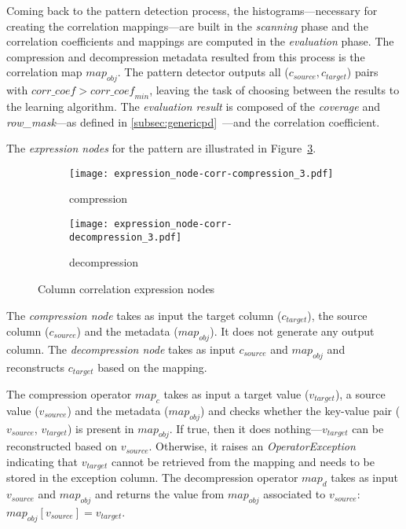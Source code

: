Coming back to the pattern detection process, the histograms---necessary for creating the correlation mappings---are built in the \textit{scanning} phase and the correlation coefficients and mappings are computed in the \textit{evaluation} phase. The compression and decompression metadata resulted from this process is the correlation map \(map_{obj}\). The pattern detector outputs all (\(c_{source}, c_{target}\)) pairs with \(\mathit{corr\_coef} > \mathit{corr\_coef}_{min}\), leaving the task of choosing between the results to the learning algorithm. The \textit{evaluation result} is composed of the \textit{coverage} and \textit{row\_mask}---as defined in \ref{subsec:genericpd}~---and the correlation coefficient.

The \textit{expression nodes} for the  pattern are illustrated in Figure~\ref{fig:pd:columncorrelation:exprnode}.

\begin{figure}[h]
  \centering
  \begin{subfigure}[t]{0.45\linewidth}
    \centering
    \texttt{[image: expression\_node-corr-compression\_3.pdf]}
    \caption[b]{compression}
    \label{fig:pd:columncorrelation:exprnode:compression}
  \end{subfigure}
  \hspace{3em}
  \begin{subfigure}[t]{0.30\linewidth}
    \centering
    \texttt{[image: expression\_node-corr-decompression\_3.pdf]}
    \caption[b]{decompression}
    \label{fig:pd:columncorrelation:exprnode:decompression}
  \end{subfigure}
  \caption{Column correlation expression nodes}
  \label{fig:pd:columncorrelation:exprnode}
\end{figure}

The \textit{compression node} takes as input the target column (\(c_{target}\)), the source column (\(c_{source}\)) and the metadata (\(map_{obj}\)). It does not generate any output column. The \textit{decompression node} takes as input \(c_{source}\) and \(map_{obj}\) and reconstructs \(c_{target}\) based on the mapping.

The compression operator \(map_{c}\) takes as input a target value (\(v_{target}\)), a source value (\(v_{source}\)) and the metadata (\(map_{obj}\)) and checks whether the key-value pair (\(v_{source}\), \(v_{target}\)) is present in \(map_{obj}\). If true, then it does nothing---\(v_{target}\) can be reconstructed based on \(v_{source}\). Otherwise, it raises an \textit{OperatorException} indicating that \(v_{target}\) cannot be retrieved from the mapping and needs to be stored in the exception column. The decompression operator \(map_{d}\) takes as input \(v_{source}\) and \(map_{obj}\) and returns the value from \(map_{obj}\) associated to \(v_{source}\): \(map_{obj}[v_{source}] = v_{target}\).

